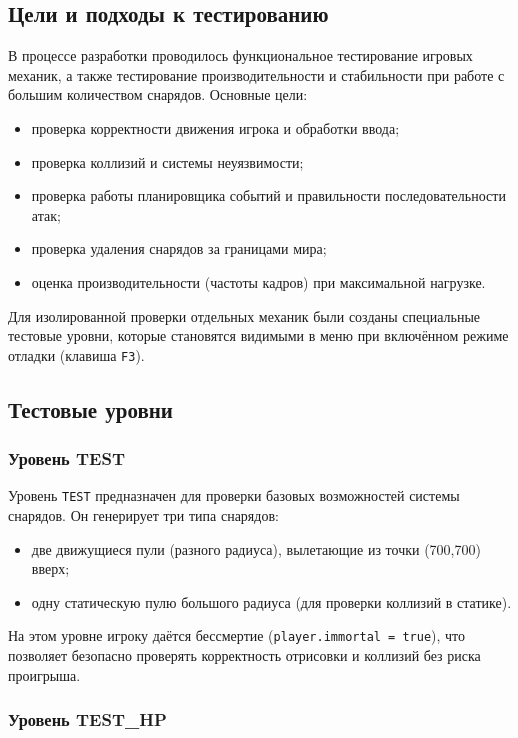 \documentclass[../main.tex]{subfiles}
\begin{document}
	
\subsection{Цели и подходы к тестированию}

В процессе разработки проводилось функциональное тестирование игровых механик, а также тестирование производительности и стабильности при работе с большим количеством снарядов. Основные цели:
\begin{itemize}
	\item проверка корректности движения игрока и обработки ввода;
	\item проверка коллизий и системы неуязвимости;
	\item проверка работы планировщика событий и правильности последовательности атак;
	\item проверка удаления снарядов за границами мира;
	\item оценка производительности (частоты кадров) при максимальной нагрузке.
\end{itemize}

Для изолированной проверки отдельных механик были созданы специальные тестовые уровни, которые становятся видимыми в меню при включённом режиме отладки (клавиша \texttt{F3}).

\subsection{Тестовые уровни}

\subsubsection{Уровень TEST}

Уровень \texttt{TEST} предназначен для проверки базовых возможностей системы снарядов. Он генерирует три типа снарядов:
\begin{itemize}
	\item две движущиеся пули (разного радиуса), вылетающие из точки (700,700) вверх;
	\item одну статическую пулю большого радиуса (для проверки коллизий в статике).
\end{itemize}
На этом уровне игроку даётся бессмертие (\texttt{player.immortal = true}), что позволяет безопасно проверять корректность отрисовки и коллизий без риска проигрыша.

\subsubsection{Уровень TEST\_HP}
\end{document}

